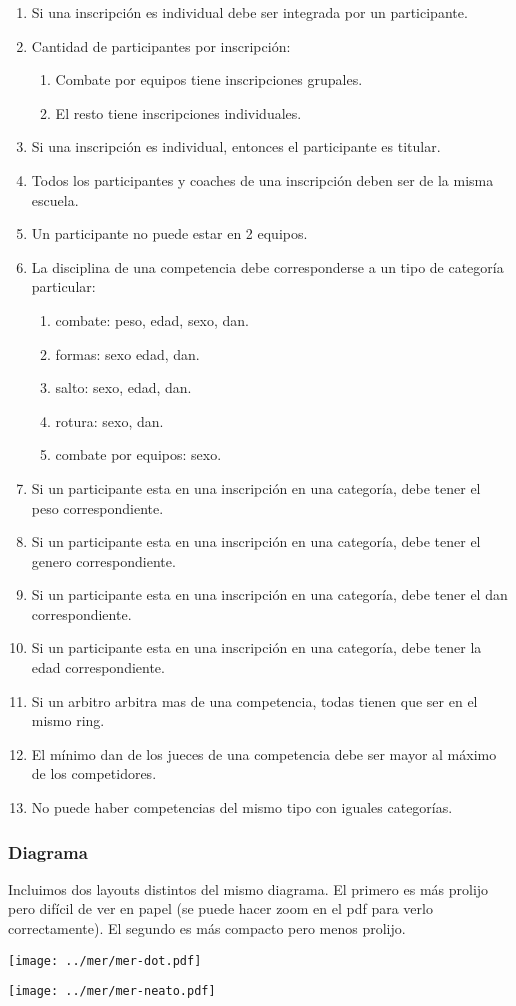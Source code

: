 \begin{enumerate}
  \item Si una inscripción es individual debe ser integrada por un participante.
  \item Cantidad de participantes por inscripción: \begin{enumerate}
    \item Combate por equipos tiene inscripciones grupales.
    \item El resto tiene inscripciones individuales. \end{enumerate}
  \item  Si una inscripción es individual, entonces el participante es titular.
  \item Todos los participantes y coaches de una inscripción deben ser de la misma escuela.
  \item Un participante no puede estar en 2 equipos.
  \item La disciplina de una competencia debe corresponderse a un tipo de categoría particular: \begin{enumerate}
    \item combate: peso, edad, sexo, dan.
    \item formas: sexo edad, dan.
    \item salto: sexo, edad, dan.
    \item rotura: sexo, dan.
    \item combate por equipos: sexo. \end{enumerate}
  \item Si un participante esta en una inscripción en una categoría, debe tener el peso correspondiente.
  \item Si un participante esta en una inscripción en una categoría, debe tener el genero correspondiente.
  \item Si un participante esta en una inscripción en una categoría, debe tener el dan correspondiente.
  \item Si un participante esta en una inscripción en una categoría, debe tener la edad correspondiente.
  \item Si un arbitro arbitra mas de una competencia, todas tienen que ser en el mismo ring.
  \item El mínimo dan de los jueces de una competencia debe ser mayor al máximo de los competidores.
  \item No puede haber competencias del mismo tipo con iguales categorías.
\end{enumerate}

\subsubsection{Diagrama}

Incluimos dos layouts distintos del mismo diagrama. El primero es más prolijo pero difícil de ver en papel (se puede hacer zoom en el pdf para verlo correctamente). El segundo es más compacto pero menos prolijo.

\newpage

\noindent
\texttt{[image: ../mer/mer-dot.pdf]}

\noindent
\texttt{[image: ../mer/mer-neato.pdf]}

